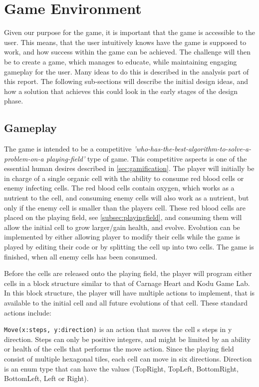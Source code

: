 \section{Game Environment}
\label{sec:game_environment}

Given our purpose for the game, it is important that the game is accessible to the user.
This means, that the user intuitively knows have the game is supposed to work, and how success within the game can be achieved.
The challenge will then be to create a game, which manages to educate, while maintaining engaging gameplay for the user.
Many ideas to do this is described in the analysis part of this report.
The following sub-sections will describe the initial design ideas, and how a solution that achieves this could look in the early stages of the design phase.

\subsection{Gameplay}

The game is intended to be a competitive \textit{'who-has-the-best-algorithm-to-solve-a-problem-on-a playing-field'} type of game.
This competitive aspects is one of the essential human desires described in \autoref{sec:gamification}.
The player will initially be in charge of a single organic cell with the ability to consume red blood cells or enemy infecting cells.
The red blood cells contain oxygen, which works as a nutrient to the cell, and consuming enemy cells will also work as a nutrient, but only if the enemy cell is smaller than the players cell.
These red blood cells are placed on the playing field, see \autoref{subsec:playingfield}, and consuming them will allow the initial cell to grow larger/gain health, and evolve.
Evolution can be implemented by either allowing player to modify their cells while the game is played by editing their code or by splitting the cell up into two cells.
The game is finished, when all enemy cells has been consumed.\newline

Before the cells are released onto the playing field, the player will program either cells in a block structure similar to that of Carnage Heart and Kodu Game Lab. In this block structure, the player will have multiple actions to implement, that is available to the initial cell and all future evolutions of that cell. These standard actions include:\newline


\verb|Move(x:steps, y:direction)| is an action that moves the cell s steps in y direction. Steps can only be positive integers, and might be limited by an ability or health of the cells that performs the move action. Since the playing field consist of multiple hexagonal tiles, each cell can move in six directions. Direction is an enum type that can have the values (TopRight, TopLeft, BottomRight, BottomLeft, Left or Right).\newline

